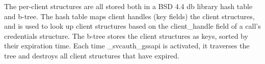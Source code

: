 The per-client structures are all stored both in a BSD 4.4 db library
hash table and b-tree.  The hash table maps client handles (key
fields) the client structures, and is used to look up client
structures based on the client_handle field of a call's credentials
structure.  The b-tree stores the client structures as keys, sorted by
their expiration time.  Each time _svcauth_gssapi is activated, it
traverses the tree and destroys all client structures that have
expired.


